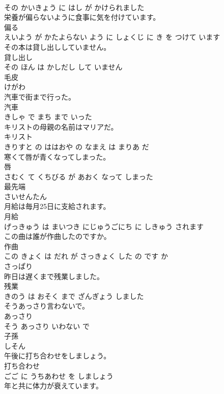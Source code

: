 \documentclass[8pt]{extreport}
\begin{document}
\begin{CJK}{UTF8}{min}
\\	その かいきょう に はし が かけられました			
\\	栄養が偏らないように食事に気を付けています。	
\\	偏る 
\\	えいよう が かたよらない よう に しょくじ に き を つけて います			
\\	その本は貸し出ししていません。	
\\	貸し出し 
\\	その ほん は かしだし して いません			
\\	毛皮	
\\	けがわ			
\\	汽車で街まで行った。	
\\	汽車 
\\	きしゃ で まち まで いった			
\\	キリストの母親の名前はマリアだ。	
\\	キリスト 
\\	きりすと の ははおや の なまえ は まりあ だ			
\\	寒くて唇が青くなってしまった。	
\\	唇 
\\	さむく て くちびる が あおく なって しまった			
\\	最先端	
\\	さいせんたん			
\\	月給は毎月25日に支給されます。	
\\	月給 
\\	げっきゅう は まいつき にじゅうごにち に しきゅう されます			
\\	この曲は誰が作曲したのですか。	
\\	作曲 
\\	この きょく は だれ が さっきょく した の です か			
\\	さっぱり	
\\	昨日は遅くまで残業しました。	
\\	残業 
\\	きのう は おそく まで ざんぎょう しました			
\\	そうあっさり言わないで。	
\\	あっさり 
\\	そう あっさり いわない で			
\\	子孫	
\\	しそん			
\\	午後に打ち合わせをしましょう。	
\\	打ち合わせ 
\\	ごご に うちあわせ を しましょう			
\\	年と共に体力が衰えています。	

\end{CJK}
\end{document}
